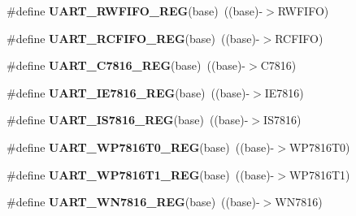 \begin{DoxyCompactItemize}
\item 
\#define {\bfseries U\+A\+R\+T\+\_\+\+R\+W\+F\+I\+F\+O\+\_\+\+R\+EG}(base)~((base)-\/$>$R\+W\+F\+I\+FO)\hypertarget{group__UART__Register__Accessor__Macros_gae268db11fe8d713c544e24683cb910c3}{}\label{group__UART__Register__Accessor__Macros_gae268db11fe8d713c544e24683cb910c3}

\item 
\#define {\bfseries U\+A\+R\+T\+\_\+\+R\+C\+F\+I\+F\+O\+\_\+\+R\+EG}(base)~((base)-\/$>$R\+C\+F\+I\+FO)\hypertarget{group__UART__Register__Accessor__Macros_gadc8c7a97ccfeb54323ebd5f3912a27ff}{}\label{group__UART__Register__Accessor__Macros_gadc8c7a97ccfeb54323ebd5f3912a27ff}

\item 
\#define {\bfseries U\+A\+R\+T\+\_\+\+C7816\+\_\+\+R\+EG}(base)~((base)-\/$>$C7816)\hypertarget{group__UART__Register__Accessor__Macros_ga62b94b094e8460ec332a7949fcd3fcbe}{}\label{group__UART__Register__Accessor__Macros_ga62b94b094e8460ec332a7949fcd3fcbe}

\item 
\#define {\bfseries U\+A\+R\+T\+\_\+\+I\+E7816\+\_\+\+R\+EG}(base)~((base)-\/$>$I\+E7816)\hypertarget{group__UART__Register__Accessor__Macros_ga8e43b652c9487967ee9a68a6647bc0bc}{}\label{group__UART__Register__Accessor__Macros_ga8e43b652c9487967ee9a68a6647bc0bc}

\item 
\#define {\bfseries U\+A\+R\+T\+\_\+\+I\+S7816\+\_\+\+R\+EG}(base)~((base)-\/$>$I\+S7816)\hypertarget{group__UART__Register__Accessor__Macros_ga884824f5edc47220e140143df9e5f055}{}\label{group__UART__Register__Accessor__Macros_ga884824f5edc47220e140143df9e5f055}

\item 
\#define {\bfseries U\+A\+R\+T\+\_\+\+W\+P7816\+T0\+\_\+\+R\+EG}(base)~((base)-\/$>$W\+P7816\+T0)\hypertarget{group__UART__Register__Accessor__Macros_ga97ce4d3dc0212a912c19407409bf7c86}{}\label{group__UART__Register__Accessor__Macros_ga97ce4d3dc0212a912c19407409bf7c86}

\item 
\#define {\bfseries U\+A\+R\+T\+\_\+\+W\+P7816\+T1\+\_\+\+R\+EG}(base)~((base)-\/$>$W\+P7816\+T1)\hypertarget{group__UART__Register__Accessor__Macros_ga2347fc1eb0a78f54ad7832c3bf294be0}{}\label{group__UART__Register__Accessor__Macros_ga2347fc1eb0a78f54ad7832c3bf294be0}

\item 
\#define {\bfseries U\+A\+R\+T\+\_\+\+W\+N7816\+\_\+\+R\+EG}(base)~((base)-\/$>$W\+N7816)\hypertarget{group__UART__Register__Accessor__Macros_gabd67cec72a6d396f76a90cdbc3a3da41}{}\label{group__UART__Register__Accessor__Macros_gabd67cec72a6d396f76a90cdbc3a3da41}


\end{DoxyCompactItemize}
